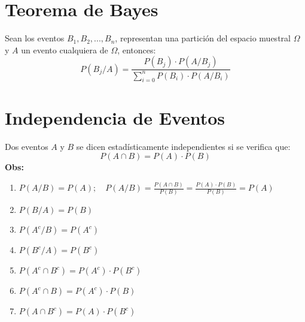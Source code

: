 \documentclass{templateNote}
\begin{document}
\section{Teorema de Bayes}
\indent
Sean los eventos $B_1,B_2, ... , B_n$, representan una partición del espacio muestral $\Omega$ y $A$
un evento cualquiera de $\Omega$, entonces:
\begin{equation*}
    P(B_j/A) = \displaystyle \frac{P(B_j) \cdot P(A/B_j)}{\displaystyle \sum_{i=0}^{n} P(B_i) \cdot P(A/B_i)}
\end{equation*}

\section{Independencia de Eventos}
Dos eventos $A$ y $B$ se dicen estadísticamente independientes si se
verifica que:
\begin{equation*}
    P(A \cap B) = P(A) \cdot P(B)
\end{equation*}
\textbf{Obs:}
\begin{enumerate}
    \item $P(A/B) = P(A); \quad P(A/B) = \frac{P(A \cap B)}{P(B)} = \frac{P(A) \cdot P(B)}{P(B)} = P(A)$
    \item $P(B/A) = P(B)$
    \item $P(A^c/B) = P(A^c)$
    \item $P(B^c/A) = P(B^c)$
    \item $P(A^c \cap B^c) = P(A^c) \cdot P(B^c)$
    \item $P(A^c \cap B) = P(A^c) \cdot P(B)$
    \item $P(A \cap B^c) = P(A) \cdot P(B^c)$
\end{enumerate}
\end{document}
